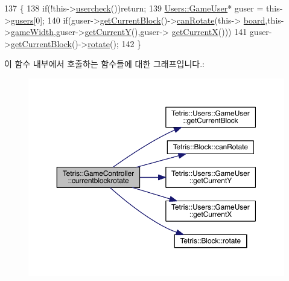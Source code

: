 \begin{DoxyCode}
137                                            \{
138                 \textcolor{keywordflow}{if}(!this->\hyperlink{class_tetris_1_1_game_controller_ab96e22daad51119b35cbee8cfb7385ef}{usercheck}())\textcolor{keywordflow}{return};
139                 \hyperlink{class_tetris_1_1_users_1_1_game_user}{Users::GameUser}* guser = this->\hyperlink{class_tetris_1_1_game_controller_a1a31d3a933daad6d95e20458eea2900e}{gusers}[0];
140                 \textcolor{keywordflow}{if}(guser->\hyperlink{class_tetris_1_1_users_1_1_game_user_a3d4bcc74d518c28356012f8a42b85896}{getCurrentBlock}()->\hyperlink{class_tetris_1_1_block_a56d194d0a5d56d2d1220ec32774cea38}{canRotate}(this->
      \hyperlink{class_tetris_1_1_game_controller_a7725b6cec9459a6bffaa3e29dd1c5196}{board},this->\hyperlink{class_tetris_1_1_game_controller_a439f215918db4127fcb44cf9d501ed63}{gameWidth},guser->\hyperlink{class_tetris_1_1_users_1_1_game_user_af5bd7ff0b575af1b42b093488cff97e2}{getCurrentY}(),guser->
      \hyperlink{class_tetris_1_1_users_1_1_game_user_ad25eace96bd27ae6df4a0c0d506be730}{getCurrentX}()))
141                 guser->\hyperlink{class_tetris_1_1_users_1_1_game_user_a3d4bcc74d518c28356012f8a42b85896}{getCurrentBlock}()->\hyperlink{class_tetris_1_1_block_a0d1eb57e6da91832ad983f7a4fa9ca04}{rotate}();
142             \}
\end{DoxyCode}
이 함수 내부에서 호출하는 함수들에 대한 그래프입니다.\+:
\nopagebreak
\begin{figure}[H]
\begin{center}
\leavevmode
\includegraphics[width=350pt]{db/dd2/class_tetris_1_1_game_controller_a5d93facb945f87ba33fb8be74df023fa_cgraph}
\end{center}
\end{figure}
\mbox{\label{class_tetris_1_1_game_controller_a5d93facb945f87ba33fb8be74df023fa}} 
